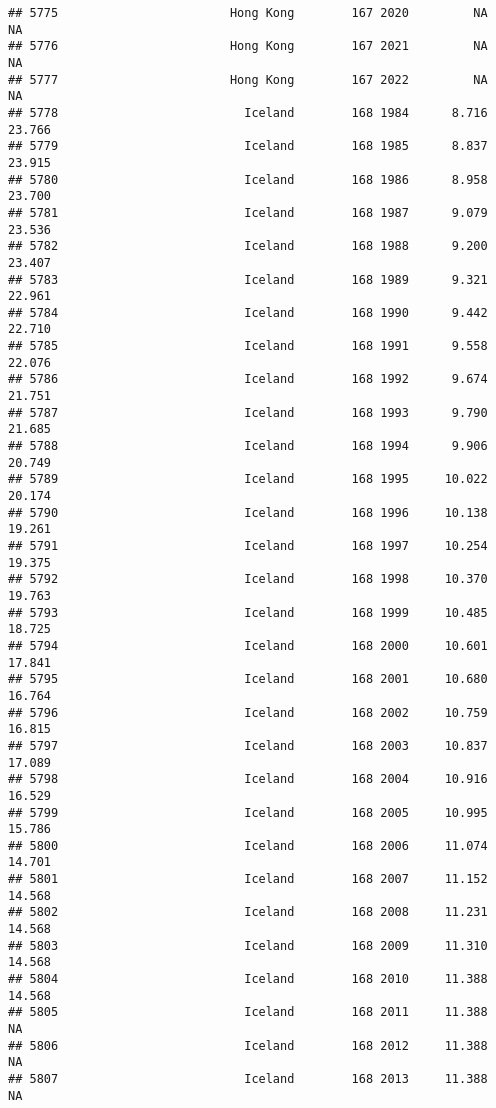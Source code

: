 \documentclass[
]{article}
\begin{document}
\begin{verbatim}
## 5775                        Hong Kong        167 2020         NA         NA
## 5776                        Hong Kong        167 2021         NA         NA
## 5777                        Hong Kong        167 2022         NA         NA
## 5778                          Iceland        168 1984      8.716     23.766
## 5779                          Iceland        168 1985      8.837     23.915
## 5780                          Iceland        168 1986      8.958     23.700
## 5781                          Iceland        168 1987      9.079     23.536
## 5782                          Iceland        168 1988      9.200     23.407
## 5783                          Iceland        168 1989      9.321     22.961
## 5784                          Iceland        168 1990      9.442     22.710
## 5785                          Iceland        168 1991      9.558     22.076
## 5786                          Iceland        168 1992      9.674     21.751
## 5787                          Iceland        168 1993      9.790     21.685
## 5788                          Iceland        168 1994      9.906     20.749
## 5789                          Iceland        168 1995     10.022     20.174
## 5790                          Iceland        168 1996     10.138     19.261
## 5791                          Iceland        168 1997     10.254     19.375
## 5792                          Iceland        168 1998     10.370     19.763
## 5793                          Iceland        168 1999     10.485     18.725
## 5794                          Iceland        168 2000     10.601     17.841
## 5795                          Iceland        168 2001     10.680     16.764
## 5796                          Iceland        168 2002     10.759     16.815
## 5797                          Iceland        168 2003     10.837     17.089
## 5798                          Iceland        168 2004     10.916     16.529
## 5799                          Iceland        168 2005     10.995     15.786
## 5800                          Iceland        168 2006     11.074     14.701
## 5801                          Iceland        168 2007     11.152     14.568
## 5802                          Iceland        168 2008     11.231     14.568
## 5803                          Iceland        168 2009     11.310     14.568
## 5804                          Iceland        168 2010     11.388     14.568
## 5805                          Iceland        168 2011     11.388         NA
## 5806                          Iceland        168 2012     11.388         NA
## 5807                          Iceland        168 2013     11.388         NA

\end{verbatim}
\end{document}
